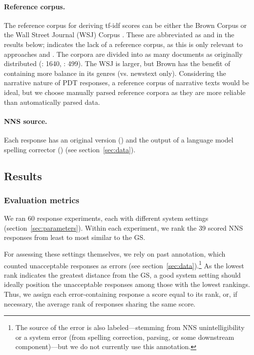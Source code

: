 \paragraph{Reference corpus.} The reference corpus for deriving tf-idf
scores can be either the Brown Corpus \citep{kucera:francis:67} or the
Wall Street Journal (WSJ) Corpus \citep{marcus-et-al:93}. These are
abbreviated as  and  in the results
below;  indicates the lack of a reference corpus, as this is
only relevant to approaches  and
. The corpora are divided into as many documents as
originally distributed (: 1640, : 499). The WSJ is
larger, but Brown has the benefit of containing more balance in its
genres (vs. newstext only). Considering the narrative nature of PDT
responses, a reference corpus of narrative texts would be ideal, but
we choose manually parsed reference corpora as they are more reliable
than automatically parsed data.

\paragraph{NNS source.} Each response has an original version
() and the output of a language model spelling corrector
() (see section~\ref{sec:data}).

\subsection{Results}

\subsubsection{Evaluation metrics}
\label{sec:metrics}

We ran 60 response experiments, each with different system settings
(section~\ref{sec:parameters}). Within each experiment, we rank the 39
scored NNS responses from least to most similar to the GS.

For assessing these settings themselves, we rely on past annotation,
which counted unacceptable responses as errors (see
section~\ref{sec:data}).\footnote{The source of the error is also
labeled---stemming from NNS unintelligibility or a system error
(from spelling correction, parsing, or some downstream
component)---but we do not currently use this annotation.}  As the
lowest rank indicates the greatest distance from the GS, a good system
setting should ideally position the unacceptable responses among those
with the lowest rankings. Thus, we assign each error-containing
response a score equal to its rank, or, if necessary, the average rank
of responses sharing the same score.

